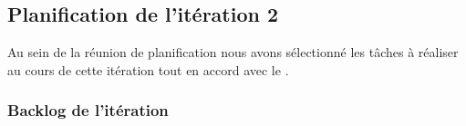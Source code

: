 

\subsection{Planification de l'itération 2}

Au sein de la réunion de planification nous avons sélectionné les tâches à
réaliser au cours de cette itération tout en accord avec le .

\subsubsection{Backlog de l'itération}

